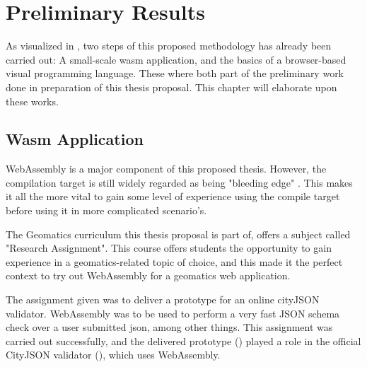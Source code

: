 

\section{Preliminary Results}
\label{sec:preliminary}

As visualized in , two steps of this proposed methodology has already been carried out: A small-scale wasm application, and the basics of a browser-based visual programming language. These where both part of the preliminary work done in preparation of this thesis proposal. This chapter will elaborate upon these works.


\subsection{Wasm Application}
\label{sec:preliminary-wasm}

WebAssembly is a major component of this proposed thesis. However, the compilation target is still widely regarded as being "bleeding edge" \cite{jangda_not_2019}. This makes it all the more vital to gain some level of experience using the compile target before using it in more complicated scenario's. 

The Geomatics curriculum this thesis proposal is part of, offers a subject called "Research Assignment". This course offers students the opportunity to gain experience in a geomatics-related topic of choice, and this made it the perfect context to try out WebAssembly for a geomatics web application.

The assignment given was to deliver a prototype for an online cityJSON validator. 
WebAssembly was to be used to perform a very fast JSON schema check over a user submitted json, among other things. 
This assignment was carried out successfully, and the delivered prototype () played a role in the official CityJSON validator (), which uses WebAssembly. 

